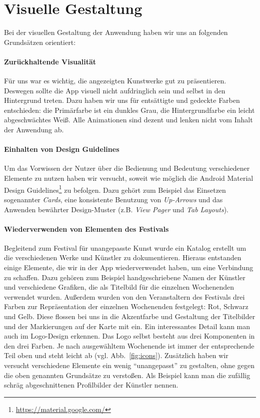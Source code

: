 \section{Visuelle Gestaltung}
\label{sec:visual}
Bei der visuellen Gestaltung der Anwendung haben wir uns an folgenden Grundsätzen orientiert:
\paragraph{Zurückhaltende Visualität}Für uns war es wichtig, die angezeigten Kunstwerke gut zu präsentieren. Deswegen sollte die App visuell nicht aufdringlich sein und selbst in den Hintergrund treten. Dazu haben wir uns für entsättigte und gedeckte Farben entschieden: die Primärfarbe ist ein dunkles Grau, die Hintergrundfarbe ein leicht abgeschwächtes Weiß. Alle Animationen sind dezent und lenken nicht vom Inhalt der Anwendung ab.
\paragraph{Einhalten von Design Guidelines} Um das Vorwissen der Nutzer über die Bedienung und Bedeutung verschiedener Elemente zu nutzen haben wir versucht, soweit wie möglich die Android Material Design Guidelines\footnote{\url{https://material.google.com/}} zu befolgen. Dazu gehört zum Beispiel das Einsetzen sogenannter \textit{Cards}, eine konsistente Benutzung von \textit{Up-Arrows} und das Anwenden bewährter Design-Muster (z.B. \textit{View Pager} und \textit{Tab Layouts}).
\paragraph{Wiederverwenden von Elementen des Festivals}\label{section_visual_elements} Begleitend zum Festival für unangepasste Kunst wurde ein Katalog erstellt um die verschiedenen Werke und Künstler zu dokumentieren. Hieraus entstanden einige Elemente, die wir in der App wiederverwendet haben, um eine Verbindung zu schaffen. Dazu gehören zum Beispiel handgeschriebene Namen der Künstler und verschiedene Grafiken, die als Titelbild für die einzelnen Wochenenden verwendet wurden. Außerdem wurden von den Veranstaltern des Festivals drei Farben zur Repräsentation der einzelnen Wochenenden festgelegt: Rot, Schwarz und Gelb. Diese flossen bei uns in die Akzentfarbe und Gestaltung der Titelbilder und der Markierungen auf der Karte mit ein. Ein interessantes Detail kann man auch im Logo-Design erkennen. Das Logo selbst besteht aus drei Komponenten in den drei Farben. Je nach ausgewähltem Wochenende ist immer der entsprechende Teil oben und steht leicht ab (vgl. Abb.~\ref{fig:icons}).
Zusätzlich haben wir versucht verschiedene Elemente ein wenig "`unangepasst"' zu gestalten, ohne gegen die oben genannten Grundsätze zu verstoßen. Als Beispiel kann man die zufällig schräg abgeschnittenen Profilbilder der Künstler nennen.

